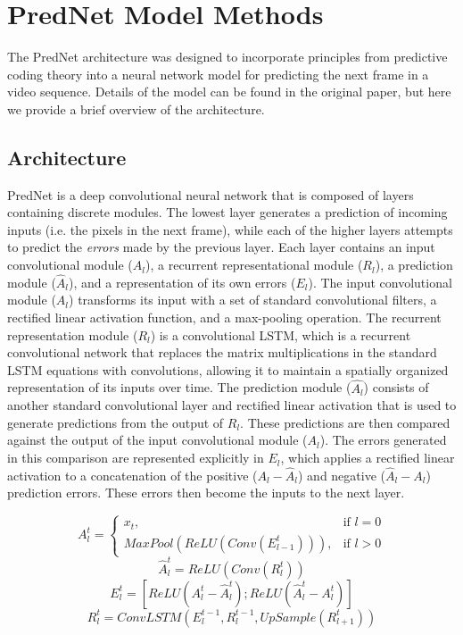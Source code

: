 \documentclass[12pt,twoside]{naturefigs}
\newif\myifpdf
\begin{document}
\section{PredNet Model Methods}

The PredNet architecture was designed to incorporate principles from predictive coding theory into a neural network model for predicting the next frame in a video sequence. Details of the model can be found in the original paper\cite{LotterKreimanCox16}, but here we provide a brief overview of the architecture. 

\subsection{Architecture}

PredNet is a deep convolutional neural network that is composed of layers containing discrete modules. The lowest layer generates a prediction of incoming inputs (i.e. the pixels in the next frame), while each of the higher layers attempts to predict the {\em errors} made by the previous layer. Each layer contains an input convolutional module ($A_l$), a recurrent representational module ($R_l$), a prediction module ($\hat{A}_l$), and a representation of its own errors ($E_l$). The input convolutional module ($A_l$) transforms its input with a set of standard convolutional filters, a rectified linear activation function, and a max-pooling operation. The recurrent representation module ($R_l$) is a convolutional LSTM, which is a recurrent convolutional network that replaces the matrix multiplications in the standard LSTM equations with convolutions, allowing it to maintain a spatially organized representation of its inputs over time. The prediction module ($\hat{A_l}$) consists of another standard convolutional layer and rectified linear activation that is used to generate predictions from the output of $R_l$. These predictions are then compared against the output of the input convolutional module ($A_l$). The errors generated in this comparison are represented explicitly in $E_l$, which applies a rectified linear activation to a concatenation of the positive ($A_l - \hat{A}_l$) and negative ($\hat{A}_l - A_l$) prediction errors. These errors then become the inputs to the next layer. 

\begin{equation}
A_l^t = 
\begin{cases}
    x_t, & \text{if } l = 0\\
    MaxPool(ReLU(Conv(E_{l-1}^t))), & \text{if } l > 0
\end{cases}
\end{equation}
\begin{equation}
\hat{A}_l^t = ReLU(Conv(R_l^t))
\end{equation}
\begin{equation}
E_l^t = [ReLU(A_l^t - \hat{A}_l^t); ReLU(\hat{A}_l^t - A_l^t)]
\end{equation}
\begin{equation}
R_l^t = ConvLSTM(E_l^{t-1},R_l^{t-1},UpSample(R_{l+1}^t))
\end{equation}
\end{document}
